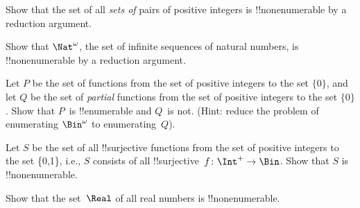 \documentclass[../../../include/open-logic-section]{subfiles}
\begin{document}
\begin{prob}
Show that the set of all \emph{sets of} pairs of positive integers is
!!{nonenumerable} by a reduction argument.
\end{prob}

\begin{prob}
Show that $\Nat^\omega$, the set of infinite sequences of
natural numbers, is !!{nonenumerable} by a reduction argument.
\end{prob}

\begin{prob}
Let $P$ be the set of functions from the set of positive
integers to the set $\{0\}$, and let $Q$ be the set of \emph{partial}
functions from the set of positive integers to the set $\{0\}$. Show
that $P$~is !!{enumerable} and $Q$~is not. (Hint: reduce the problem
of enumerating $\Bin^\omega$ to enumerating~$Q$).
\end{prob}

\begin{prob}
Let $S$ be the set of all !!{surjective} functions from the set of
positive integers to the set \{0,1\}, i.e., $S$ consists of all
!!{surjective}~$f\colon \Int^+ \to \Bin$.  Show that $S$ is
!!{nonenumerable}.
\end{prob}

\begin{prob}
Show that the set~$\Real$ of all real numbers is !!{nonenumerable}.
\end{prob}
\end{document}
